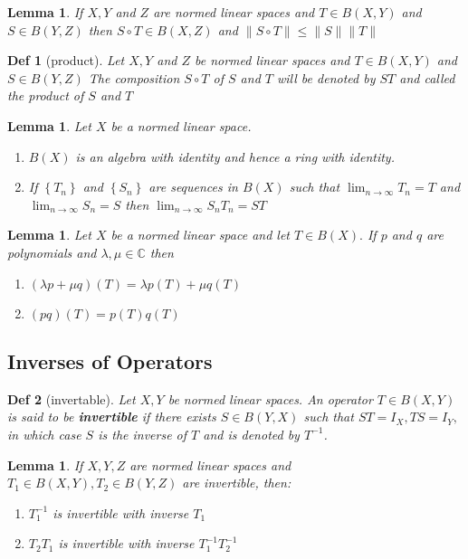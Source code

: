 \documentclass[10pt]{paper}
\newtheorem{definition}{Def}[section]
\newtheorem{lemma}[theorem]{Lemma}
\begin{document}
\begin{lemma}
    If $X, Y$ and $Z$ are normed linear spaces and $T \in B(X, Y)$ and $S \in B(Y, Z)$ then $S \circ T \in B(X, Z)$ and $\|S \circ T\| \leq\|S\|\|T\|$
\end{lemma}

\begin{definition}[product]
    Let $X, Y$ and $Z$ be normed linear spaces and $T \in B(X, Y)$ and $S \in B(Y, Z)$ The composition $S \circ T$ of $S$ and $T$ will be denoted by $S T$ and called the product of $S$ and $T$
\end{definition}

\begin{lemma}
    Let $X$ be a normed linear space.
    \begin{enumerate}
        \item $B(X)$ is an algebra with identity and hence a ring with identity.
        \item If $\left\{T_{n}\right\}$ and $\left\{S_{n}\right\}$ are sequences in $B(X)$ such that $\lim _{n \rightarrow \infty} T_{n}=T$ and $\lim _{n \rightarrow \infty} S_{n}=S$ then $\lim _{n \rightarrow \infty} S_{n} T_{n}=S T$
    \end{enumerate}
\end{lemma}

\begin{lemma}
    Let $X$ be a normed linear space and let $T \in B(X) .$ If $p$ and $q$ are polynomials and $\lambda, \mu \in \mathbb{C}$ then
    \begin{enumerate}
        \item $(\lambda p+\mu q)(T)=\lambda p(T)+\mu q(T)$
        \item $(p q)(T)=p(T) q(T)$
    \end{enumerate}
\end{lemma}

\subsection{Inverses of Operators }

\begin{definition}[invertable]
    Let $X, Y$ be normed linear spaces. An operator $T \in B(X, Y)$ is said to be \textbf{invertible} if there exists $S \in B(Y, X)$ such that $S T=I_{X}, T S=I_{Y},$ in which case $S$ is the inverse of $T$ and is denoted by $T^{-1}$.
\end{definition}

\begin{lemma}
    If $X, Y, Z$ are normed linear spaces and $T_{1} \in B(X, Y), T_{2} \in B(Y, Z)$ are invertible, then:
    \begin{enumerate}
        \item $T_{1}^{-1}$ is invertible with inverse $T_{1}$
        \item $T_{2} T_{1}$ is invertible with inverse $T_{1}^{-1} T_{2}^{-1}$
    \end{enumerate}
\end{lemma}
\end{document}
